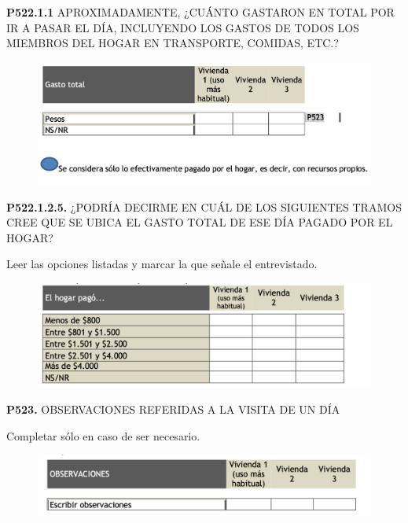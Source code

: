 \documentclass[
  openany]{book}
\begin{document}
\textbf{P522.1.1} APROXIMADAMENTE, ¿CUÁNTO GASTARON EN TOTAL POR IR A PASAR EL DÍA, INCLUYENDO LOS GASTOS DE TODOS LOS MIEMBROS DEL HOGAR EN TRANSPORTE, COMIDAS, ETC.?

\begin{figure}

{\centering \includegraphics[width=1\linewidth]{imagenes/figura6-203} 

}

\end{figure}

\textbf{P522.1.2.5.} ¿PODRÍA DECIRME EN CUÁL DE LOS SIGUIENTES TRAMOS CREE QUE SE UBICA EL GASTO TOTAL DE ESE DÍA PAGADO POR EL HOGAR?

Leer las opciones listadas y marcar la que señale el entrevistado.

\begin{figure}

{\centering \includegraphics[width=1\linewidth]{imagenes/figura6-204} 

}

\end{figure}

\textbf{P523.} OBSERVACIONES REFERIDAS A LA VISITA DE UN DÍA

Completar sólo en caso de ser necesario.

\begin{figure}

{\centering \includegraphics[width=1\linewidth]{imagenes/figura6-205} 

}

\end{figure}
\end{document}
